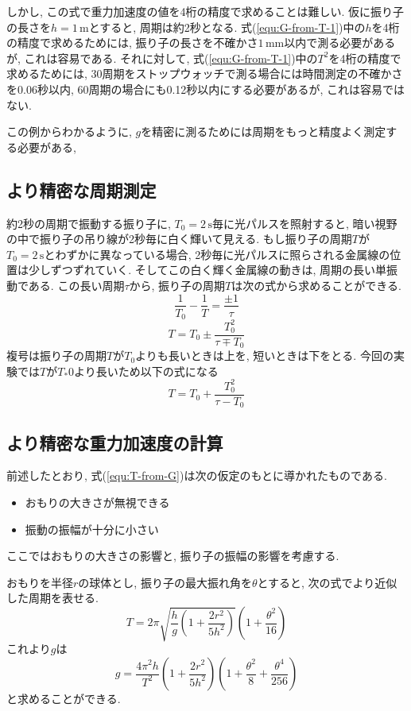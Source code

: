 \documentclass{jarticle}
\begin{document}
しかし, この式で重力加速度の値を4桁の精度で求めることは難しい.
仮に振り子の長さを$h=1\,\mathrm{m}$とすると, 周期は約2秒となる.
式(\ref{equ:G-from-T-1})中の$h$を4桁の精度で求めるためには, 振り子の長さを不確かさ$1\,\mathrm{mm}$以内で測る必要があるが, これは容易である.
それに対して, 式(\ref{equ:G-from-T-1})中の$T^2$を4桁の精度で求めるためには, 30周期をストップウォッチで測る場合には時間測定の不確かさを0.06秒以内, 60周期の場合にも0.12秒以内にする必要があるが, これは容易ではない.

この例からわかるように, $g$を精密に測るためには周期をもっと精度よく測定する必要がある,


\subsection{より精密な周期測定}

約2秒の周期で振動する振り子に, $T_0=2\,\mathrm{s}$毎に光パルスを照射すると, 暗い視野の中で振り子の吊り線が2秒毎に白く輝いて見える.
もし振り子の周期$T$が$T_0=2\,\mathrm{s}$とわずかに異なっている場合, 2秒毎に光パルスに照らされる金属線の位置は少しずつずれていく.
そしてこの白く輝く金属線の動きは, 周期の長い単振動である.
この長い周期$\tau$から, 振り子の周期$T$は次の式から求めることができる.
\begin{equation}
  \frac{1}{T_0}-\frac{1}{T}=\frac{\pm1}{\tau}
\end{equation}
\begin{equation}
  T=T_0\pm\frac{T_0^2}{\tau\mp T_0}
\end{equation}
複号は振り子の周期$T$が$T_0$よりも長いときは上を, 短いときは下をとる.
今回の実験では$T$が$T_*0$より長いため以下の式になる
\begin{equation}
  \label{eq:T-from-tau}
  T=T_0+\frac{T_0^2}{\tau-T_0}
\end{equation}


\subsection{より精密な重力加速度の計算}

前述したとおり, 式(\ref{equ:T-from-G})は次の仮定のもとに導かれたものである.
\begin{itemize}
  \item おもりの大きさが無視できる
  \item 振動の振幅が十分に小さい
\end{itemize}
ここではおもりの大きさの影響と, 振り子の振幅の影響を考慮する.

おもりを半径$r$の球体とし, 振り子の最大振れ角を$\theta$とすると, 次の式でより近似した周期を表せる.
\begin{equation}
  T=2\pi\sqrt{\frac{h}{g}\left(1+\frac{2r^2}{5h^2}\right)}\left(1+\frac{\theta^2}{16}\right)
\end{equation}
これより$g$は
\begin{equation}
  \label{eq:G-from-T-2}
  g=\frac{4\pi^2h}{T^2}\left(1+\frac{2r^2}{5h^2}\right)\left(1+\frac{\theta^2}{8}+\frac{\theta^4}{256}\right)
\end{equation}
と求めることができる.
\end{document}
